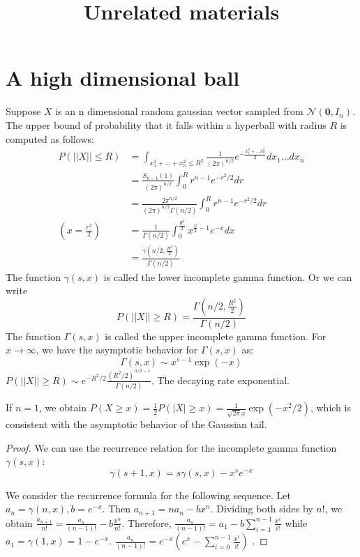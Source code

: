\documentclass{article}
\title{Unrelated materials}
\begin{document}
\maketitle
\section{A high dimensional ball}
Suppose $X$ is an n dimensional random gaussian vector
sampled from
$\mathcal{N}(\bm{0}, I_n)$. The upper bound of probability that it
falls within a hyperball with radius $R$ is computed
as follows:
\begin{align*}
    P(||X||\leq R) &= \int_{x_1^2 + \dots + x_n^2 \leq R^2}
    \frac{1}{(2\pi)^{n/2}}
    e^{-\frac{x_1^2 + \dots x_n^2}{2}}
    dx_1 \dots dx_n\\
    &= \frac{S_{n-1}(1) }{(2\pi)^{n/2}}
    \int_0^R r^{n-1} e^{-r^2/2}dr
    \\
    &=\frac{2\pi^{n/2}}{(2\pi)^{n/2}\Gamma(n/2)}
    \int_0^R r^{n-1} e^{-r^2/2}dr \\
    (x=\frac{r^2}{2})
    &=\frac{1}{\Gamma(n/2)}
    \int_0^{\frac{R^2}{2}} x^{\frac{n}{2} - 1} e^{-x}dx\\
    &=\frac{\gamma(n/2, \frac{R^2}{2})}{\Gamma(n/2)}
\end{align*}
The function $\gamma(s,x)$
is called the lower
incomplete gamma function.
Or we can write
\begin{equation}
P(||X||\geq R)
= \frac{\Gamma(n/2, \frac{R^2}{2})}
{\Gamma(n/2)}
\end{equation}
The function $\Gamma(s,x)$
is called the upper incomplete
gamma function.
For $x\to \infty$,
we have the asymptotic behavior for $\Gamma(s,x)$
as:
\begin{equation}
    \Gamma(s,x) \sim x^{s-1} \exp(-x)
\end{equation}
$P(||X||\geq R) \sim e^{-R^2/2}\frac{(R^2/2)^{n/2-1}}{\Gamma(n/2)}$.
The decaying rate exponential.

If $n=1$, we obtain $P(X\geq x) = \frac{1}{2}P(|X|\geq x)
= \frac{1}{\sqrt{2\pi }x}\exp(-x^2/2)$, which is consistent with
the asymptotic behavior of the Gaussian tail.

\begin{proof}
We can use the recurrence relation for the
incomplete gamma function $\gamma(s,x)$:
\begin{equation}
    \gamma(s+1, x)
    = s\gamma(s, x) - x^s e^{-x}
\end{equation}

We consider the recurrence formula for the
following sequence. Let $a_{n}=\gamma(n, x), b=e^{-x}$.
Then $a_{n+1} = n a_n - bx^n$.
Dividing both sides by $n!$, we obtain
$\frac{a_{n+1}}{n!} =
\frac{a_n}{(n-1)!} - b\frac{x^n}{n!}$.
Therefore, $\frac{a_n}{(n-1)!} = a_1 - b\sum_{i=1}^{n-1}
\frac{x^i}{i!}$ while $a_1 = \gamma(1, x)
=1-e^{-x}$.
$\frac{a_n}{(n-1)!} = e^{-x}
(e^x-\sum_{i=0}^{n-1} \frac{x^i}{i!})$
.
\end{proof}
\end{document}
